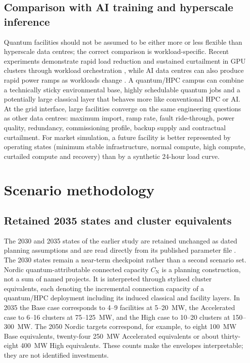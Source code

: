 \documentclass[11pt,a4paper]{article}
\newcommand{\CN}{C_{\mathrm{N}}}
\begin{document}
\subsection{Comparison with AI training and hyperscale inference}
Quantum facilities should not be assumed to be either more or less flexible than hyperscale data centres; the correct comparison is workload-specific. Recent experiments demonstrate rapid load reduction and sustained curtailment in GPU clusters through workload orchestration \citep{williams2026flex}, while AI data centres can also produce rapid power ramps as workloads change \citep{majumder2026ramps}. A quantum/HPC campus can combine a technically sticky environmental base, highly schedulable quantum jobs and a potentially large classical layer that behaves more like conventional HPC or AI. At the grid interface, large facilities converge on the same engineering questions as other data centres: maximum import, ramp rate, fault ride-through, power quality, redundancy, commissioning profile, backup supply and contractual curtailment. For market simulation, a future facility is better represented by operating states (minimum stable infrastructure, normal compute, high compute, curtailed compute and recovery) than by a synthetic 24-hour load curve.

\section{Scenario methodology}\label{sec:method}
\subsection{Retained 2035 states and cluster equivalents}
The 2030 and 2035 states of the earlier study are retained unchanged as dated planning assumptions and are read directly from its published parameter file \citep{merilehto2026qc2035}. The 2030 states remain a near-term checkpoint rather than a second scenario set. Nordic quantum-attributable connected capacity $\CN$ is a planning construction, not a sum of named projects. It is interpreted through stylised cluster equivalents, each denoting the incremental connection capacity of a quantum/HPC deployment including its induced classical and facility layers. In 2035 the Base case corresponds to 4--9 facilities at 5--20~MW, the Accelerated case to 6--16 clusters at 75--125~MW, and the High case to 10--20 clusters at 150--300~MW. The 2050 Nordic targets correspond, for example, to eight 100~MW Base equivalents, twenty-four 250~MW Accelerated equivalents or about thirty-eight 400~MW High equivalents. These counts make the envelopes interpretable; they are not identified investments.
\end{document}
